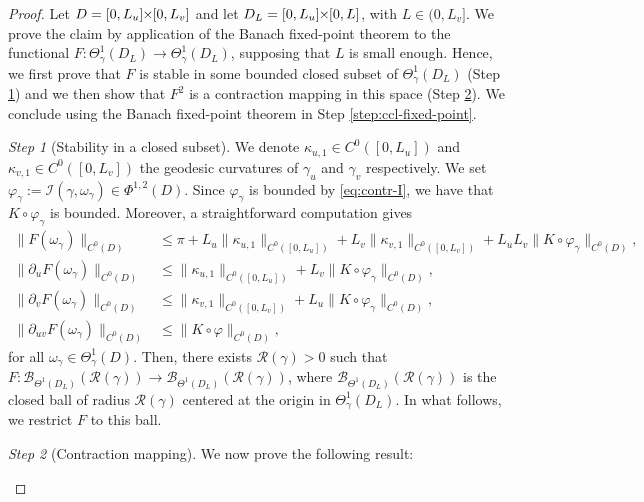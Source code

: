 \documentclass{article}
\newcommand{\I}{\mathcal{I}}
\newcommand{\RR}{\mathcal{R}}
\newcommand{\PLH}{{\mkern-1mu\times\mkern-1mu}}
\newcommand{\Times}{\PLH}
\newcommand{\ko}{\kappa}
\theoremstyle{remark}
\theoremstyle{prpart}
\newtheorem{proofpart}{Step}
\newcommand{\B}{\mathcal{B}}
\begin{document}
\begin{proof}
Let $D=[0,L_u]\Times[0,L_v]$ and let $D_L=[0,L_u]\Times[0,L]$, with $L\in(0,L_v]$. We prove the claim by application of the Banach fixed-point theorem to the functional $F : \Theta_\gamma^1(D_L)\to\Theta_\gamma^1(D_L)$, supposing that $L$ is small enough. Hence, we first prove that $F$ is stable in some bounded closed subset of $\Theta_\gamma^1(D_L)$ (Step \ref{step:bound-func}) and we then show that $F^2$ is a contraction mapping in this space (Step \ref{step:lips-F}). We conclude using the Banach fixed-point theorem in Step \ref{step:ccl-fixed-point}.

\begin{proofpart}[Stability in a closed subset]\label{step:bound-func}
  We denote $\ko_{u,1}\in C^0([0,L_u])$ and $\ko_{v,1}\in C^0([0,L_v])$ the geodesic curvatures of $\gamma_u$ and $\gamma_v$ respectively. We set $\varphi_\gamma := \I(\gamma,\omega_\gamma)\in\Phi^{1,2}(D)$. Since $\varphi_\gamma$ is bounded by \eqref{eq:contr-I}, we have that $K\circ\varphi_\gamma$ is bounded. Moreover, a straightforward computation gives %
  \begin{align*}
    \|F(\omega_\gamma)\|_{C^0(D)} &\leq \pi+L_u\|\ko_{u,1}\|_{C^0([0,L_u])} + L_v\|\ko_{v,1}\|_{C^0([0,L_v])}
    + L_uL_v \|K\circ\varphi_\gamma\|_{C^0(D)},\\
    \|\partial_u F(\omega_\gamma)\|_{C^0(D)} &\leq \|\ko_{u,1}\|_{C^0([0,L_u])} 
    + L_v \|K\circ\varphi_\gamma\|_{C^0(D)},\\
    \|\partial_v F(\omega_\gamma)\|_{C^0(D)} &\leq \|\ko_{v,1}\|_{C^0([0,L_v])} 
    + L_u \|K\circ\varphi_\gamma\|_{C^0(D)},\\
    \|\partial_{uv} F(\omega_\gamma)\|_{C^0(D)} &\leq \|K\circ\varphi\|_{C^0(D)},
  \end{align*}
  for all $\omega_\gamma\in \Theta^1_\gamma(D)$. Then, there exists $\RR(\gamma)>0$ such that $F : \B_{\Theta^1(D_L)}(\RR(\gamma)) \to \B_{\Theta^1(D_L)}(\RR(\gamma))$, where $\B_{\Theta^1(D_L)}(\RR(\gamma))$ is the closed ball of radius $\RR(\gamma)$ centered at the origin in $\Theta^1_\gamma(D_L)$. In what follows, we restrict $F$ to this ball.
\end{proofpart}

\begin{proofpart}[Contraction mapping]\label{step:lips-F}
We now prove the following result:  


\end{proofpart}
\end{proof}
\end{document}
